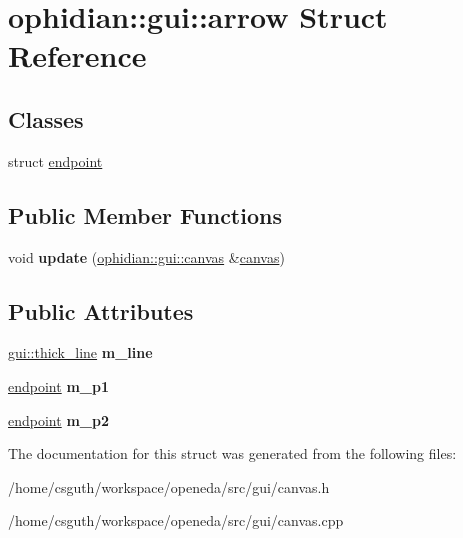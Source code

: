 \hypertarget{structophidian_1_1gui_1_1arrow}{\section{ophidian\-:\-:gui\-:\-:arrow Struct Reference}
\label{structophidian_1_1gui_1_1arrow}
}
\subsection*{Classes}
\begin{DoxyCompactItemize}
\item 
struct \hyperlink{structophidian_1_1gui_1_1arrow_1_1endpoint}{endpoint}
\end{DoxyCompactItemize}
\subsection*{Public Member Functions}
\begin{DoxyCompactItemize}
\item 
\hypertarget{structophidian_1_1gui_1_1arrow_a311bd9a080a100ab7bdc54ee3c41de17}{void {\bfseries update} (\hyperlink{classophidian_1_1gui_1_1canvas}{ophidian\-::gui\-::canvas} \&\hyperlink{classophidian_1_1gui_1_1canvas}{canvas})}\label{structophidian_1_1gui_1_1arrow_a311bd9a080a100ab7bdc54ee3c41de17}

\end{DoxyCompactItemize}
\subsection*{Public Attributes}
\begin{DoxyCompactItemize}
\item 
\hypertarget{structophidian_1_1gui_1_1arrow_aae951c94d55ee4bf76e71a27178c98bf}{\hyperlink{structophidian_1_1gui_1_1thick__line}{gui\-::thick\-\_\-line} {\bfseries m\-\_\-line}}\label{structophidian_1_1gui_1_1arrow_aae951c94d55ee4bf76e71a27178c98bf}

\item 
\hypertarget{structophidian_1_1gui_1_1arrow_ae7ab0f25fcd425b33a14cb28821b14ad}{\hyperlink{structophidian_1_1gui_1_1arrow_1_1endpoint}{endpoint} {\bfseries m\-\_\-p1}}\label{structophidian_1_1gui_1_1arrow_ae7ab0f25fcd425b33a14cb28821b14ad}

\item 
\hypertarget{structophidian_1_1gui_1_1arrow_a14d1745b2a8387a413dacd8309329673}{\hyperlink{structophidian_1_1gui_1_1arrow_1_1endpoint}{endpoint} {\bfseries m\-\_\-p2}}\label{structophidian_1_1gui_1_1arrow_a14d1745b2a8387a413dacd8309329673}

\end{DoxyCompactItemize}


The documentation for this struct was generated from the following files\-:\begin{DoxyCompactItemize}
\item 
/home/csguth/workspace/openeda/src/gui/canvas.\-h\item 
/home/csguth/workspace/openeda/src/gui/canvas.\-cpp\end{DoxyCompactItemize}
